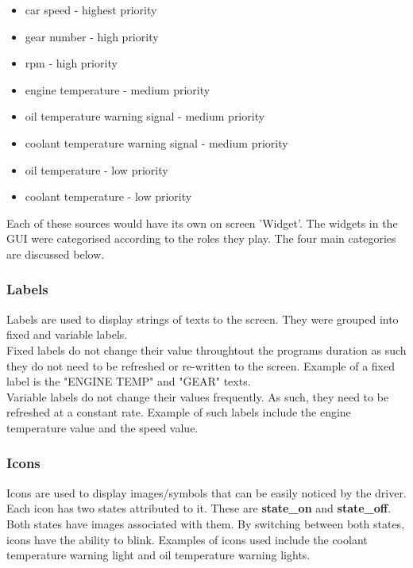 \documentclass[11pt]{report} %
\begin{document}
	\begin{itemize}
		\item car speed - highest priority
		\item gear number - high priority
		\item rpm - high priority
		\item engine temperature - medium priority
		\item oil temperature warning signal - medium priority
		\item coolant temperature warning signal - medium priority
		\item oil temperature - low priority
		\item coolant temperature - low priority
	\end{itemize}

	Each of these sources would have its own on screen 'Widget'. The widgets in the GUI were 
	categorised according to the roles they play. The four main categories are discussed below.

	
	\subsubsection{Labels}
		
	Labels are used to display strings of texts to the screen. They were grouped into 
	fixed and variable labels. \\
			
	Fixed labels do not change their value throughtout the programs duration
	as such they do not need to be refreshed or re-written to the screen. Example of a fixed label
	is the "ENGINE TEMP" and "GEAR" texts. \\
			
	Variable labels do not change their values frequently. As such, they need to be refreshed at a constant rate.
	Example of such labels include the engine temperature value and the speed value.
			
	\subsubsection{Icons}
			
	Icons are used to display images/symbols that can be easily noticed by the driver. 
	Each icon has two states attributed to it. These are {\bf state\_on} and {\bf state\_off}. Both states have images associated 
	with them.
	By  switching between both states, icons have the ability to blink. 
	Examples of icons used include the coolant temperature warning light and oil temperature warning lights.
			
\end{document}
